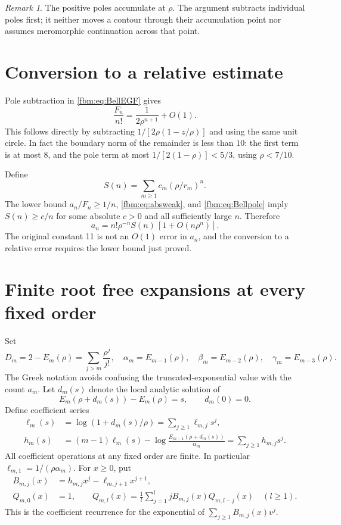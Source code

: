 \documentclass[11pt]{article}
\theoremstyle{remark}\newtheorem{remark}[theorem]{Remark}
\begin{document}
\begin{remark}
The positive poles accumulate at $\rho$. The argument subtracts individual poles first; it neither moves a contour through their accumulation point nor assumes meromorphic continuation across that point.
\end{remark}

\section{Conversion to a relative estimate}\label{fbm:sec:relative}
Pole subtraction in \eqref{fbm:eq:BellEGF} gives
\begin{equation}\label{fbm:eq:Bellpole}
 \frac{F_n}{n!}=\frac1{2\rho^{n+1}}+O(1).
\end{equation}
This follows directly by subtracting $1/[2\rho(1-z/\rho)]$ and using the same unit circle. In fact the boundary norm of the remainder is less than $10$: the first term is at most $8$, and the pole term at most $1/[2(1-\rho)]<5/3$, using $\rho<7/10$.

Define
\[
 S(n)=\sum_{m\geq1}c_m(\rho/r_m)^n.
\]
The lower bound $a_n/F_n\geq1/n$, \eqref{fbm:eq:absweak}, and \eqref{fbm:eq:Bellpole} imply $S(n)\geq c/n$ for some absolute $c>0$ and all sufficiently large $n$. Therefore
\begin{equation}\label{fbm:eq:relative}
 a_n=n!\rho^{-n}S(n)\,[1+O(n\rho^n)].
\end{equation}
The original constant 11 is not an $O(1)$ error in $a_n$, and the conversion to a relative error requires the lower bound just proved.

\section{Finite root free expansions at every fixed order}\label{fbm:sec:expansion}
Set
\begin{equation}\label{fbm:eq:D}
 D_m=2-E_m(\rho)=\sum_{j>m}\frac{\rho^j}{j!},\quad
 \alpha_m=E_{m-1}(\rho),\quad \beta_m=E_{m-2}(\rho),\quad
 \gamma_m=E_{m-3}(\rho).
\end{equation}
The Greek notation avoids confusing the truncated-exponential value with the count $a_m$. Let $d_m(s)$ denote the local analytic solution of
\[
 E_m(\rho+d_m(s))-E_m(\rho)=s,\qquad d_m(0)=0.
\]
Define coefficient series
\begin{align}
 \ell_m(s)&=\log(1+d_m(s)/\rho)=\sum_{j\geq1}\ell_{m,j}s^j,\label{fbm:eq:ell}\\
 h_m(s)&=(m-1)\ell_m(s)-\log\frac{E_{m-1}(\rho+d_m(s))}{\alpha_m}
       =\sum_{j\geq1}h_{m,j}s^j.\label{fbm:eq:h}
\end{align}
All coefficient operations at any fixed order are finite. In particular $\ell_{m,1}=1/(\rho\alpha_m)$. For $x\geq0$, put
\begin{align}
 B_{m,j}(x)&=h_{m,j}x^j-\ell_{m,j+1}x^{j+1},\label{fbm:eq:bj}\\
 Q_{m,0}(x)&=1,\qquad
 Q_{m,l}(x)=\frac1l\sum_{j=1}^l jB_{m,j}(x)Q_{m,l-j}(x)\quad(l\geq1).\label{fbm:eq:Qrec}
\end{align}
This is the coefficient recurrence for the exponential of $\sum_{j\geq1}B_{m,j}(x)v^j$.
\end{document}
